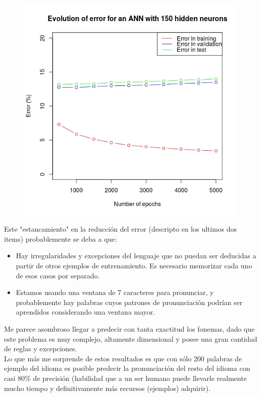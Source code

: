 \documentclass[paper=a4, fontsize=11pt]{scrartcl} %
\numberwithin{equation}{section} %
\numberwithin{figure}{section} %
\numberwithin{table}{section} %
\begin{document}
\begin{figure}[h!]
\centering
\includegraphics[width=112mm]{imgs/annresults2.jpg}
\end{figure}

Este "estancamiento" en la reducción del error (descripto en los ultimos dos items) probablemente se deba a que:

\begin{itemize}
\item Hay irregularidades y excepciones del lenguaje que no puedan ser deducidas a partir de otros ejemplos de entrenamiento. Es necesario memorizar cada uno de esos casos por separado.
\item Estamos usando una ventana de 7 caracteres para pronunciar, y probablemente hay palabras cuyos patrones de pronunciación podrían ser aprendidos considerando una ventana mayor.
\end{itemize}


Me parece asombroso llegar a predecir con tanta exactitud los fonemas, dado que este problema es muy complejo, altamente dimensional y posee una gran cantidad de reglas y excepciones. \\

Lo que más me sorprende de estos resultados es que con sólo 200 palabras de ejemplo del idioma es posible predecir la pronunciación del resto del idioma con casi 80\% de precisión (habilidad que a un ser humano puede llevarle realmente mucho tiempo y definitivamente más recursos (ejemplos) adquirir). \\
\end{document}
